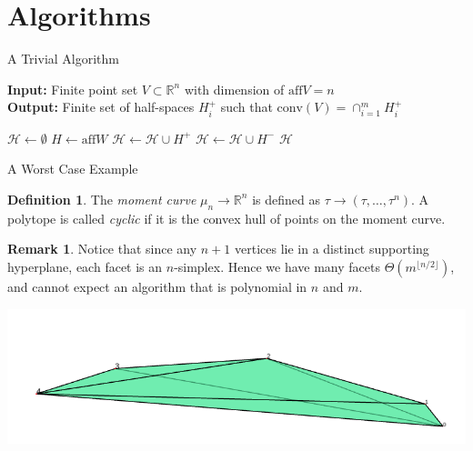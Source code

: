 \documentclass[9pt]{beamer}
\newcommand\R{\mathbb{R}}
\theoremstyle{definition}
\newtheorem{remark}{Remark}
\newtheorem{defn}{Definition}
\begin{document}
\section{Algorithms}

\begin{frame}[fragile]{A Trivial Algorithm}
  
  \begin{algorithm}[H]
    \textbf{Input:} Finite point set $V \subset \R^n$ with dimension of $\text{aff}V = n$\\
    \textbf{Output:} Finite set of half-spaces $H_i^+$ such that $\text{conv}(V) =
    \cap_{i=1}^m H_i^+$
    \begin{algorithmic}[1]
      \STATE $\mathcal{H} \leftarrow \emptyset$
      \STATE $H \leftarrow \text{aff} W$
      \STATE $\mathcal{H} \leftarrow \mathcal{H} \cup H^+$
      \ELSE $\mathcal{H} \leftarrow \mathcal{H} \cup H^-$
      \ENDIF
      \ENDFOR
      \RETURN $\mathcal{H}$
    \end{algorithmic}
  \end{algorithm}
\end{frame}

\begin{frame}[fragile]{A Worst Case Example}
  \begin{defn}
    The \emph{moment curve} $\mu_n \to \mathbb{R}^n$ is defined as
    $\tau \to (\tau, \dots, \tau^n)$. A polytope is called \emph{cyclic}
    if it is the convex hull of points on the moment curve.
  \end{defn}
    
  \begin{remark}
    Notice that since any $n + 1$ vertices lie in a distinct supporting
    hyperplane, each facet is an $n$-simplex. Hence we have many facets $\Theta(m^{\lfloor n / 2 \rfloor })$, and cannot expect an algorithm that is polynomial in $n$ and $m$.
  
  \end{remark}

  \begin{center}
    \includegraphics[width=.30\textwidth, height=0.4\textheight]{images/cyclic}
  \end{center}
\end{frame}
\end{document}
